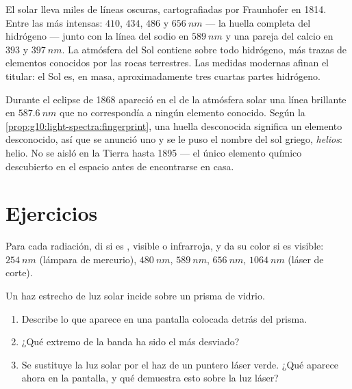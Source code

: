 \begin{example}\label{ex:g10:light-spectra:sunrecipe}
El  solar lleva miles de líneas oscuras, cartografiadas por
Fraunhofer en 1814. Entre las más intensas: $410$, $434$, $486$ y
$\qty{656}{nm}$ --- la huella completa del hidrógeno --- junto con la
línea del sodio en $\qty{589}{nm}$ y una pareja del calcio en $393$ y
$\qty{397}{nm}$. La atmósfera del Sol contiene sobre todo hidrógeno, más
trazas de elementos conocidos por las rocas terrestres. Las medidas
modernas afinan el titular: el Sol es, en masa, aproximadamente tres
cuartas partes hidrógeno.
\end{example}

\begin{remark}\label{rem:g10:light-spectra:helium}
Durante el eclipse de 1868 apareció en el  de la atmósfera solar
una línea brillante en $\qty{587.6}{nm}$ que no correspondía a ningún
elemento conocido. Según la
\cref{prop:g10:light-spectra:fingerprint}, una huella desconocida
significa un elemento desconocido, así que se anunció uno y se le puso
el nombre del sol griego, \emph{helios}: helio. No se aisló en la Tierra
hasta 1895 --- el único elemento químico descubierto en el espacio antes
de encontrarse en casa.
\end{remark}

\section{Ejercicios}

\begin{exercise}[$\star$]\label{exo:g10:light-spectra:1}
Para cada radiación, di si es , visible o infrarroja, y da
su color si es visible: $\qty{254}{nm}$ (lámpara de mercurio),
$\qty{480}{nm}$, $\qty{589}{nm}$, $\qty{656}{nm}$, $\qty{1064}{nm}$
(láser de corte).
\end{exercise}

\begin{exercise}[$\star$]\label{exo:g10:light-spectra:2}
Un haz estrecho de luz solar incide sobre un prisma de vidrio.
\begin{enumerate}
  \item Describe lo que aparece en una pantalla colocada detrás del
        prisma.
  \item ¿Qué extremo de la banda ha sido el más desviado?
  \item Se sustituye la luz solar por el haz de un puntero láser verde.
        ¿Qué aparece ahora en la pantalla, y qué demuestra esto sobre la
        luz láser?
\end{enumerate}
\end{exercise}

